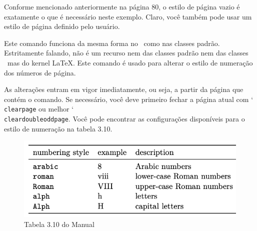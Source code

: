 Conforme mencionado anteriormente na página 80, o estilo de página vazio é exatamente o que é necessário neste exemplo. Claro, você também pode usar um estilo de página definido pelo usuário.


Este comando funciona da mesma forma no \KOMAScript\ como nas classes padrão. Estritamente falando, não é um recurso nem das classes padrão nem das classes \KOMAScript\ mas do kernel \LaTeX. Este comando é usado para alterar o estilo de numeração dos números de página.

As alterações entram em vigor imediatamente, ou seja, a partir da página que contém o comando. Se necessário, você deve primeiro fechar a página atual com \char`\\\texttt{clear\-page} ou melhor \char`\\\texttt{clear\-dou\-ble\-odd\-page}. Você pode encontrar as configurações disponíveis para o estilo de numeração na tabela 3.10.

\begin{figure}[hb]
    \centering
    \includegraphics[width=0.7\linewidth]{tab3_10.png}
    \caption{Tabela 3.10 do Manual}
    \label{fig:tab3_10}
\end{figure}

